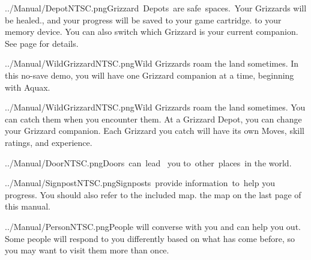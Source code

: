 \documentclass[9pt,twocolumn,openany,article,crop]{memoir}
\newcommand\englishskip{\vspace{14pt}}
\begin{document}
\ifdefined\ATARIAGESAVE \pagebreak \else \englishskip \fi

\lettrine[image=true,                lines=4,               findent=3pt,
nindent=3pt]{../Manual/DepotNTSC.png}\nobreak\hspace{.2em plus 0}Grizzard~Depots~are
safe~spaces.~Your Grizzards will be healed\ifdefined\NOSAVE{}.{}\else{},
and your  progress will  be saved  \ifdefined\ATARIAGESAVE to  your game
cartridge. \else  to your memory device.  \fi You can also  switch which
Grizzard    is     your    current     companion.    \fi     See    page
\pageref{sec:GrizzardDepot} for details.

\englishskip

\ifdefined\NOSAVE

\lettrine[image=true,                lines=4,               findent=3pt,
nindent=3pt]{../Manual/WildGrizzardNTSC.png}\nobreak\hspace{.2em plus 0}Wild  Grizzards
roam  the land  sometimes.  In  this no-save  demo,  you  will have  one
Grizzard companion at a time, beginning with Aquax.

\else

\lettrine[image=true,                lines=4,               findent=3pt,
nindent=3pt]{../Manual/WildGrizzardNTSC.png}\nobreak\hspace{.2em plus 0}Wild  Grizzards
roam the  land sometimes. You  can catch  them when you  encounter them.
At  a   Grizzard  Depot,  you   can  change  your   Grizzard  companion.
Each  Grizzard  you  catch  will  have its  own  Moves,  skill  ratings,
and experience.

\fi

\englishskip

\lettrine[image=true,                lines=4,               findent=3pt,
nindent=3pt]{../Manual/DoorNTSC.png}\nobreak\hspace{.2em plus 0}Doors~can~lead~ you
to~other~places~in the world. \\

\englishskip

\lettrine[image=true,                lines=4,               findent=3pt,
nindent=3pt]{../Manual/SignpostNTSC.png}\nobreak\hspace{.2em plus 0}Signposts~provide
information~to~help   you   progress.   You   should   also   refer   to
\ifdefined\ATARIAGESAVE the included map. \else the map on the last page
of this manual. \fi

\englishskip

\lettrine[image=true,                lines=4,               findent=3pt,
nindent=3pt]{../Manual/PersonNTSC.png}\nobreak\hspace{.2em plus 0}People
will converse with you and can help you out. Some people will respond to
you differently based on what has come  before, so you may want to visit
them more than once.
\end{document}
